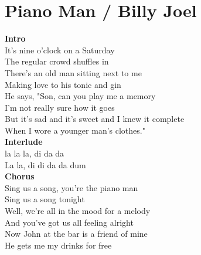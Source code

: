 \section{Piano Man / Billy Joel}\label{sec:pianoman}

\Cmajor
\Gmajor
\Fmajor
\DmajorSeven
\Aminor
\GmajorSeven
\Amajor
\EmajorEasy
\DmajorEasy
\BmajorSeven
\FsharpMinor


\textbf{Intro} 
                \\
It's nine o'clock on a Saturday\\
The regular crowd shuffles in\\
There's an old man sitting next to me\\
Making love to his tonic and gin\\
He says, "Son, can you play me a memory\\
I'm not really sure how it goes\\
But it's sad and it's sweet and I knew it complete\\
When I wore a younger man's clothes."\\
\textbf{Interlude}\\
la la la, di da da\\
La la, di di da da dum  \\
\textbf{Chorus}\\
Sing us a song, you're the piano man\\
Sing us a song tonight\\
Well, we're all in the mood for a melody\\
And you've got us all feeling alright\\
Now John at the bar is a friend of mine\\
He gets me my drinks for free\\
